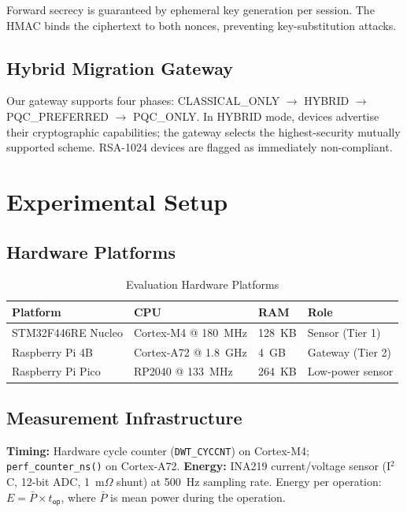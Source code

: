 \documentclass[10pt,journal,compsoc]{IEEEtran}
\begin{document}
Forward secrecy is guaranteed by ephemeral key generation per session.
The HMAC binds the ciphertext to both nonces, preventing
key-substitution attacks.

\subsection{Hybrid Migration Gateway}

Our gateway supports four phases:
CLASSICAL\_ONLY $\to$ HYBRID $\to$ PQC\_PREFERRED $\to$ PQC\_ONLY.
In HYBRID mode, devices advertise their cryptographic capabilities;
the gateway selects the highest-security mutually supported scheme.
RSA-1024 devices are flagged as immediately non-compliant.

\section{Experimental Setup}
\label{sec:setup}

\subsection{Hardware Platforms}

\begin{table}[h]
\centering
\caption{Evaluation Hardware Platforms}
\label{tab:hardware}
\begin{tabular}{@{}llll@{}}
\toprule
Platform & CPU & RAM & Role \\ \midrule
STM32F446RE Nucleo & Cortex-M4 @ 180~MHz & 128~KB & Sensor (Tier 1) \\
Raspberry Pi 4B    & Cortex-A72 @ 1.8~GHz & 4~GB  & Gateway (Tier 2) \\
Raspberry Pi Pico  & RP2040 @ 133~MHz & 264~KB    & Low-power sensor \\
\bottomrule
\end{tabular}
\end{table}

\subsection{Measurement Infrastructure}

\textbf{Timing:} Hardware cycle counter (\texttt{DWT\_CYCCNT}) on
Cortex-M4; \texttt{perf\_counter\_ns()} on Cortex-A72.
\textbf{Energy:} INA219 current/voltage sensor (I$^2$C, 12-bit ADC,
1~m$\Omega$ shunt) at 500~Hz sampling rate.
Energy per operation: $E = \bar{P} \times t_\mathsf{op}$,
where $\bar{P}$ is mean power during the operation.
\end{document}
